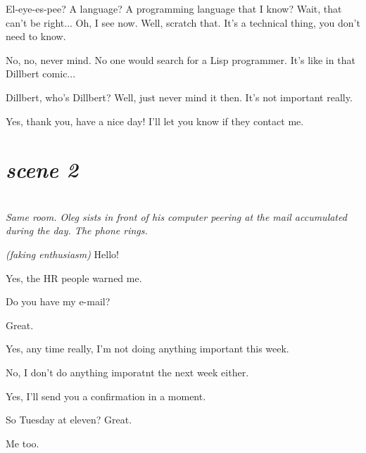 \documentclass[11pt,a4paper,oneside]{memoir}
\begin{document}
\begin{description}[itemsep=1ex,leftmargin=1cm]
\item[Oleg] El-eye-es-pee? A language? A programming language that I
  know? Wait, that can't be right... Oh, I see now. Well, scratch
  that. It's a technical thing, you don't need to know.

\item[Oleg] No, no, never mind. No one would search for a Lisp
  programmer. It's like in that Dillbert comic...

\item[Oleg] Dillbert, who's Dillbert? Well, just never mind it then.
  It's not important really.

\item[Oleg] Yes, thank you, have a nice day! I'll let you know if
  they contact me.

\end{description}
\vskip 1cm  %

\section*{\hfill\textit{scene 2}}
\begin{description}[itemsep=1ex,leftmargin=1cm]

\item[] \hfill \\
  \textit{Same room. Oleg sists in front of his computer peering at
    the mail accumulated during the day. The phone rings.}

\item[Oleg] \textit{(faking enthusiasm)} Hello!

\item[Oleg] Yes, the HR people warned me.

\item[Oleg] Do you have my e-mail?

\item[Oleg] Great.

\item[Oleg] Yes, any time really, I'm not doing anything important
  this week.

\item[Oleg] No, I don't do anything imporatnt the next week either.

\item[Oleg] Yes, I'll send you a confirmation in a moment.

\item[Oleg] So Tuesday at eleven? Great.

\item[Oleg] Me too.

\end{description}
\vskip 1cm
\end{document}
